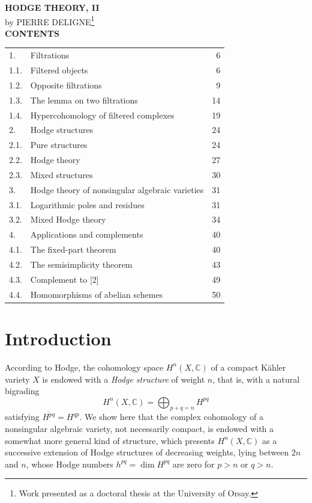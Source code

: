 \documentclass[10pt]{article}
\newcommand{\C}{\mathbb C}
\begin{document}
\begin{center}
{\Large\bfseries HODGE THEORY, II}\\[0.4em]
{\normalsize by PIERRE DELIGNE\footnote{Work presented as a doctoral thesis at the University of Orsay.}}\\[1.3em]
{\bfseries CONTENTS}
\end{center}

\begin{center}
\begin{tabular}{llr}
1. & Filtrations & 6\\
1.1. & Filtered objects & 6\\
1.2. & Opposite filtrations & 9\\
1.3. & The lemma on two filtrations & 14\\
1.4. & Hypercohomology of filtered complexes & 19\\
2. & Hodge structures & 24\\
2.1. & Pure structures & 24\\
2.2. & Hodge theory & 27\\
2.3. & Mixed structures & 30\\
3. & Hodge theory of nonsingular algebraic varieties & 31\\
3.1. & Logarithmic poles and residues & 31\\
3.2. & Mixed Hodge theory & 34\\
4. & Applications and complements & 40\\
4.1. & The fixed-part theorem & 40\\
4.2. & The semisimplicity theorem & 43\\
4.3. & Complement to [2] & 49\\
4.4. & Homomorphisms of abelian schemes & 50
\end{tabular}
\end{center}

\section*{Introduction}

According to Hodge, the cohomology space $H^n(X,\C)$ of a compact Kähler variety $X$ is endowed with a \emph{Hodge structure} of weight $n$, that is, with a natural bigrading
\[
H^n(X,\C)=\bigoplus_{p+q=n}H^{pq}
\]
satisfying $\overline{H^{pq}}=H^{qp}$. We show here that the complex cohomology of a nonsingular algebraic variety, not necessarily compact, is endowed with a somewhat more general kind of structure, which presents $H^n(X,\C)$ as a successive extension of Hodge structures of decreasing weights, lying between $2n$ and $n$, whose Hodge numbers $h^{pq}=\dim H^{pq}$ are zero for $p>n$ or $q>n$.
\end{document}
